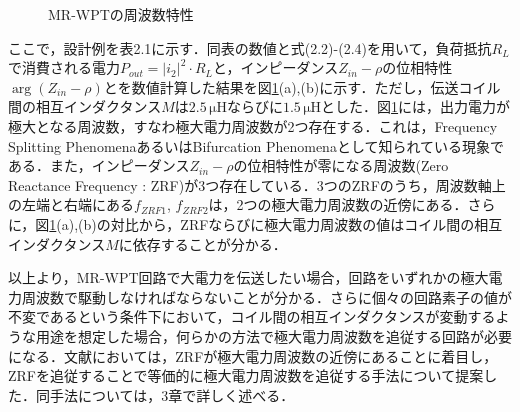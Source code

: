 \begin{figure}[h]

	\begin{center}
    \end{center}
  \caption{MR-WPTの周波数特性}\label{freqchar}
\end{figure}

ここで，設計例を表2.1に示す．同表の数値と式(2.2)-(2.4)を用いて，負荷抵抗$R_L$で消費される電力$P_{out}=|i_2|^2 \cdot R_L$と，インピーダンス$Z_{in}-\rho$の位相特性$\arg(Z_{in}-\rho)$とを数値計算した結果を図\ref{freqchar}(a),(b)に示す．ただし，伝送コイル間の相互インダクタンス$M$は$2.5 \, \mathrm{\mu H}$ならびに$1.5 \, \mathrm{\mu H}$とした．図\ref{freqchar}には，出力電力が極大となる周波数，すなわ極大電力周波数が2つ存在する．これは，Frequency Splitting PhenomenaあるいはBifurcation Phenomenaとして知られている現象である\cite{Wang2004,Hoeher2019,Niu2013}．また，インピーダンス$Z_{in}-\rho$の位相特性が零になる周波数(Zero Reactance Frequency : ZRF)が3つ存在している．3つのZRFのうち，周波数軸上の左端と右端にある$f_{ZRF1}$, $f_{ZRF2}$は，2つの極大電力周波数の近傍にある．さらに，図\ref{freqchar}(a),(b)の対比から，ZRFならびに極大電力周波数の値はコイル間の相互インダクタンス$M$に依存することが分かる．\par 
以上より，MR-WPT回路で大電力を伝送したい場合，回路をいずれかの極大電力周波数で駆動しなければならないことが分かる．さらに個々の回路素子の値が不変であるという条件下において，コイル間の相互インダクタンスが変動するような用途を想定した場合，何らかの方法で極大電力周波数を追従する回路が必要になる．文献\cite{Fujita2019a}においては，ZRFが極大電力周波数の近傍にあることに着目し，ZRFを追従することで等価的に極大電力周波数を追従する手法について提案した．同手法については，3章で詳しく述べる．

